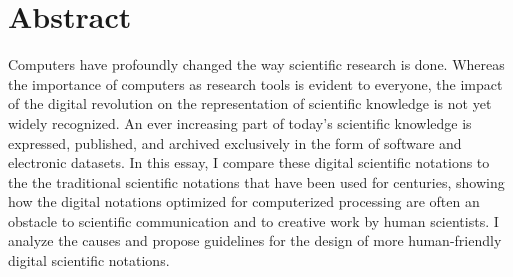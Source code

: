 \section*{Abstract}

Computers have profoundly changed the way scientific research is done. Whereas the importance of computers as research tools is evident to everyone, the impact of the digital revolution on the representation of scientific knowledge is not yet widely recognized. An ever increasing part of today's scientific knowledge is expressed, published, and archived exclusively in the form of software and electronic datasets.  In this essay, I compare these digital scientific notations to the the traditional scientific notations that have been used for centuries, showing how the digital notations optimized for computerized processing are often an obstacle to scientific communication and to creative work by human scientists. I analyze the causes and propose guidelines for the design of more human-friendly digital scientific notations.